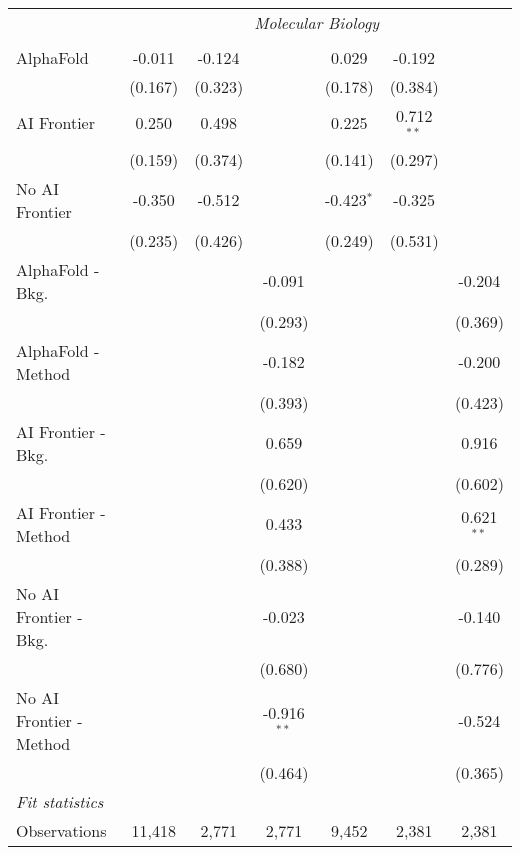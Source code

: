 \begin{tabular}{lcccccc}
 & \multicolumn{6}{c}{\textit{Molecular Biology}} \\ \\
   AlphaFold               & -0.011  & -0.124  &               & 0.029        & -0.192       &   \\   
                           & (0.167) & (0.323) &               & (0.178)      & (0.384)      &   \\   
   AI Frontier             & 0.250   & 0.498   &               & 0.225        & 0.712$^{**}$ &   \\   
                           & (0.159) & (0.374) &               & (0.141)      & (0.297)      &   \\   
   No AI Frontier          & -0.350  & -0.512  &               & -0.423$^{*}$ & -0.325       &   \\   
                           & (0.235) & (0.426) &               & (0.249)      & (0.531)      &   \\   
   AlphaFold - Bkg.        &         &         & -0.091        &              &              & -0.204\\   
                           &         &         & (0.293)       &              &              & (0.369)\\   
   AlphaFold - Method      &         &         & -0.182        &              &              & -0.200\\   
                           &         &         & (0.393)       &              &              & (0.423)\\   
   AI Frontier - Bkg.      &         &         & 0.659         &              &              & 0.916\\   
                           &         &         & (0.620)       &              &              & (0.602)\\   
   AI Frontier - Method    &         &         & 0.433         &              &              & 0.621$^{**}$\\   
                           &         &         & (0.388)       &              &              & (0.289)\\   
   No AI Frontier - Bkg.   &         &         & -0.023        &              &              & -0.140\\   
                           &         &         & (0.680)       &              &              & (0.776)\\   
   No AI Frontier - Method &         &         & -0.916$^{**}$ &              &              & -0.524\\   
                           &         &         & (0.464)       &              &              & (0.365)\\   
   \midrule
   \emph{Fit statistics}\\
   Observations            & 11,418  & 2,771   & 2,771         & 9,452        & 2,381        & 2,381\\  
   

\end{tabular}
